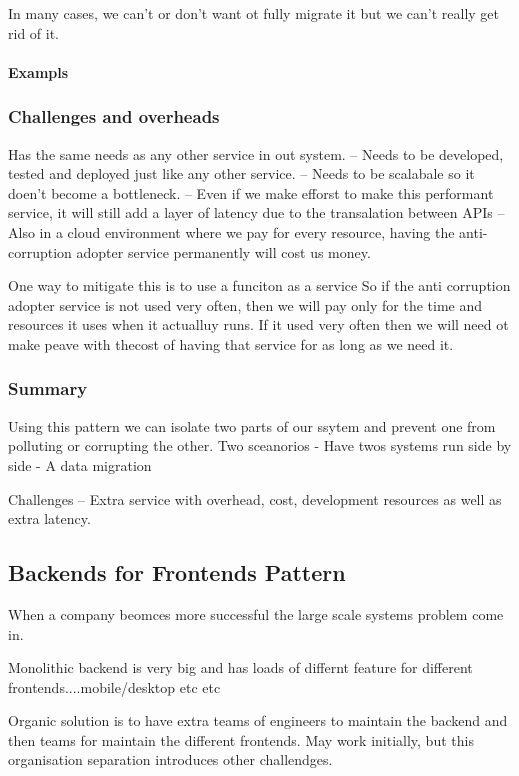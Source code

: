 \documentclass[a4paper, 11pt]{book}
\begin{document}
    In many cases, we can't or don't want ot fully migrate it but we can't really get rid of it.

    \paragraph{Exampls}

    \subsubsection{Challenges and overheads}
    Has the same needs as any other service in out system.
    -- Needs to be developed, tested and deployed just like any other service.
    -- Needs to be scalabale so it doen't become a bottleneck.
    -- Even if we make efforst to make this performant service, it will still add a layer of latency due to the transalation between APIs
    -- Also in a cloud environment where we pay for every resource, having the anti-corruption adopter service permanently will cost us money.

    One way to mitigate this is to use a funciton as a service
    So if the anti corruption adopter service is not used very often, then we will pay only for the time and resources it uses when it actualluy runs.
    If it used very often then we will need ot make peave with thecost of having that service for as long as we need it.

    \subsubsection{Summary}
    Using this pattern we can isolate two parts of our ssytem and prevent one from polluting or corrupting the other.
    Two sceanorios
    - Have twos systems run side by side
    - A data migration

    Challenges
    -- Extra service with overhead, cost, development resources as well as extra latency.

    \subsection{Backends for Frontends Pattern}
    When a company beomces more successful the large scale systems problem come in.

    Monolithic backend is very big and has loads of differnt feature for different frontends....mobile/desktop etc etc

    Organic solution is to have extra teams of engineers to maintain the backend and then teams for maintain the different frontends.
    May work initially, but this organisation separation introduces other challendges.
\end{document}
